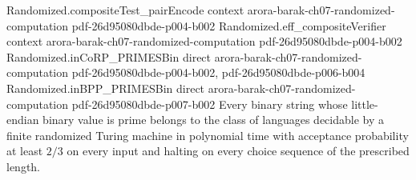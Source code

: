 \begin{theorem}
\proofstep
  {Randomized.compositeTest_pairEncode}
  {context}
  {arora-barak-ch07-randomized-computation}
  {pdf-26d95080dbde-p004-b002}
\proofstep
  {Randomized.eff_compositeVerifier}
  {context}
  {arora-barak-ch07-randomized-computation}
  {pdf-26d95080dbde-p004-b002}
\proofstep
  {Randomized.inCoRP_PRIMESBin}
  {direct}
  {arora-barak-ch07-randomized-computation}
  {pdf-26d95080dbde-p004-b002,
    pdf-26d95080dbde-p006-b004}
\proofstep
  {Randomized.inBPP_PRIMESBin}
  {direct}
  {arora-barak-ch07-randomized-computation}
  {pdf-26d95080dbde-p007-b002}
Every binary string whose little-endian binary value is prime belongs to the class of
languages decidable by a finite randomized Turing machine in polynomial time with
acceptance probability at least $2/3$ on every input and halting on every choice
sequence of the prescribed length.
\end{theorem}
